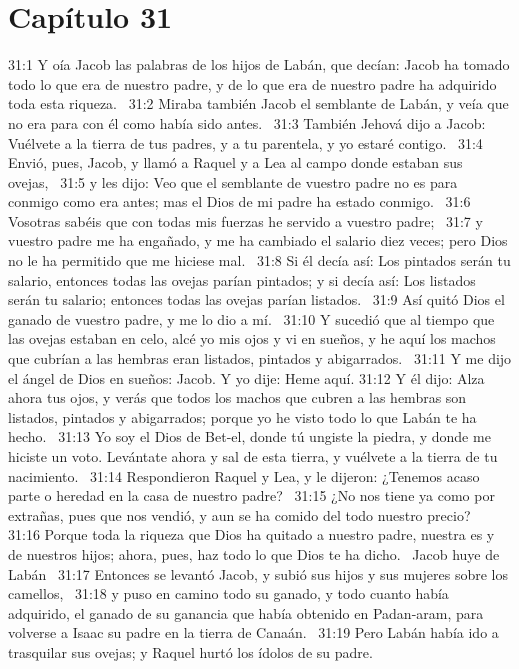 \section*{Capítulo 31 }

31:1 Y oía Jacob las palabras de los hijos de Labán, que decían: Jacob ha tomado todo lo que era de nuestro padre, y de lo que era de nuestro padre ha adquirido toda esta riqueza.  
31:2 Miraba también Jacob el semblante de Labán, y veía que no era para con él como había sido antes.  
31:3 También Jehová dijo a Jacob: Vuélvete a la tierra de tus padres, y a tu parentela, y yo estaré contigo.  
31:4 Envió, pues, Jacob, y llamó a Raquel y a Lea al campo donde estaban sus ovejas,  
31:5 y les dijo: Veo que el semblante de vuestro padre no es para conmigo como era antes; mas el Dios de mi padre ha estado conmigo.  
31:6 Vosotras sabéis que con todas mis fuerzas he servido a vuestro padre;  
31:7 y vuestro padre me ha engañado, y me ha cambiado el salario diez veces; pero Dios no le ha permitido que me hiciese mal.  
31:8 Si él decía así: Los pintados serán tu salario, entonces todas las ovejas parían pintados; y si decía así: Los listados serán tu salario; entonces todas las ovejas parían listados.  
31:9 Así quitó Dios el ganado de vuestro padre, y me lo dio a mí.  
31:10 Y sucedió que al tiempo que las ovejas estaban en celo, alcé yo mis ojos y vi en sueños, y he aquí los machos que cubrían a las hembras eran listados, pintados y abigarrados.  
31:11 Y me dijo el ángel de Dios en sueños: Jacob. Y yo dije: Heme aquí. 
31:12 Y él dijo: Alza ahora tus ojos, y verás que todos los machos que cubren a las hembras son listados, pintados y abigarrados; porque yo he visto todo lo que Labán te ha hecho.  
31:13 Yo soy el Dios de Bet-el, donde tú ungiste la piedra, y donde me hiciste un voto. Levántate ahora y sal de esta tierra, y vuélvete a la tierra de tu nacimiento.  
31:14 Respondieron Raquel y Lea, y le dijeron: ¿Tenemos acaso parte o heredad en la casa de nuestro padre?  
31:15 ¿No nos tiene ya como por extrañas, pues que nos vendió, y aun se ha comido del todo nuestro precio?  
31:16 Porque toda la riqueza que Dios ha quitado a nuestro padre, nuestra es y de nuestros hijos; ahora, pues, haz todo lo que Dios te ha dicho.  
Jacob huye de Labán  
31:17 Entonces se levantó Jacob, y subió sus hijos y sus mujeres sobre los camellos,  
31:18 y puso en camino todo su ganado, y todo cuanto había adquirido, el ganado de su ganancia que había obtenido en Padan-aram, para volverse a Isaac su padre en la tierra de Canaán.  
31:19 Pero Labán había ido a trasquilar sus ovejas; y Raquel hurtó los ídolos de su padre.  

